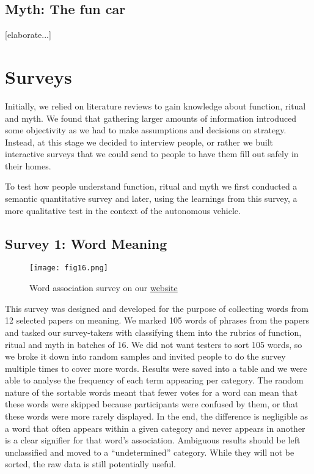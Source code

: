 \documentclass[12pt, usenames, dvipsnames]{report}
\begin{document}
\begin{flushleft}
\section{Myth: The fun car}

[elaborate...]


\chapter{Surveys}

Initially, we relied on literature reviews to gain knowledge about function, ritual and myth.
We found that gathering larger amounts of information introduced some objectivity as we had to make assumptions and decisions on strategy. 
Instead, at this stage we decided to interview people, or rather we built interactive surveys that we could send to people to have them fill out safely in their homes.

To test how people understand function, ritual and myth we first conducted a semantic quantitative survey and later, using the learnings from this survey, a more qualitative test in the context of the autonomous vehicle.


\section{Survey 1: Word Meaning}

\vspace*{1.2em}
\begin{figure}[!htbp]
  \hspace*{-3.666em}
  \texttt{[image: fig16.png]}
  \caption{Word association survey on our \href{https://meaning.pub}{website}}
  \label{fig:figure16}
\end{figure}
\vspace*{1.2em}

This survey was designed and developed for the purpose of collecting words from 12 selected papers on meaning. 
We marked 105 words of phrases from the papers and tasked our survey-takers with classifying them into the rubrics of function, ritual and myth in batches of 16.
We did not want testers to sort 105 words, so we broke it down into random samples and invited people to do the survey multiple times to cover more words.
Results were saved into a table and we were able to analyse the frequency of each term appearing per category.
The random nature of the sortable words meant that fewer votes for a word can mean that these words were skipped because participants were confused by them, or that these words were more rarely displayed.
In the end, the difference is negligible as a word that often appears within a given category and never appears in another is a clear signifier for that word's association.
Ambiguous results should be left unclassified and moved to a ``undetermined'' category.
While they will not be sorted, the raw data is still potentially useful.


\end{flushleft}
\end{document}
